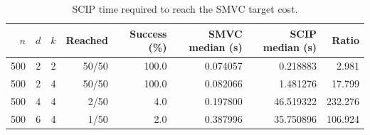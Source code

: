 \begin{table}[t]
\centering
\caption{SCIP time required to reach the SMVC target cost.}
\label{tab:experiment-6-time-to-target}
\begin{tabular}{rrrrrrrr}
\toprule
$n$ & $d$ & $k$ & Reached & Success (\%) & SMVC median (s) & SCIP median (s) & Ratio \\
\midrule
500 & 2 & 2 & 50/50 & 100.0 & 0.074057 & 0.218883 & 2.981 \\
500 & 2 & 4 & 50/50 & 100.0 & 0.082066 & 1.481276 & 17.799 \\
500 & 4 & 4 & 2/50 & 4.0 & 0.197800 & 46.519322 & 232.276 \\
500 & 6 & 4 & 1/50 & 2.0 & 0.387996 & 35.750896 & 106.924 \\
\bottomrule
\end{tabular}
\end{table}
